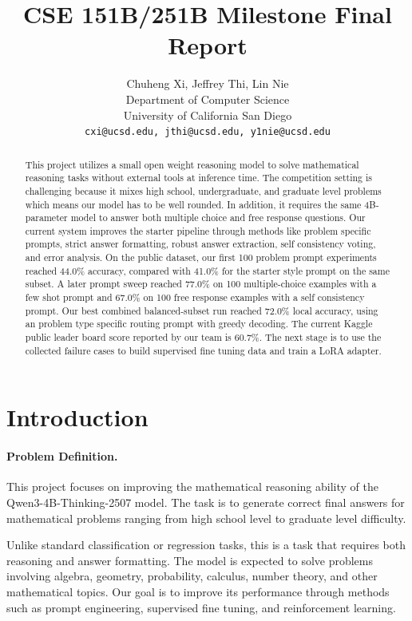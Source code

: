 \documentclass{article}
\title{
CSE 151B/251B Milestone Final Report
\\
}
\author{%
  Chuheng Xi, Jeffrey Thi, Lin Nie
  \\
  Department of Computer Science\\
  University of California San Diego\\
  \texttt{cxi@ucsd.edu, jthi@ucsd.edu, y1nie@ucsd.edu} \\
}
\begin{document}
\maketitle


\begin{abstract}
This project utilizes a small open weight reasoning model to solve mathematical reasoning tasks without external tools at inference time. The competition setting is challenging because it mixes high school, undergraduate, and graduate level problems which means our model has to be well rounded. In addition, it requires the same 4B-parameter model to answer both multiple choice and free response questions. Our current system improves the starter pipeline through methods like problem specific prompts, strict answer formatting, robust answer extraction, self consistency voting, and error analysis. On the public dataset, our first 100 problem prompt experiments reached 44.0\% accuracy, compared with 41.0\% for the starter style prompt on the same subset. A later prompt sweep reached 77.0\% on 100 multiple-choice examples with a few shot prompt and 67.0\% on 100 free response examples with a self consistency prompt. Our best combined balanced-subset run reached 72.0\% local accuracy, using an problem type specific routing prompt with greedy decoding. The current Kaggle public leader board score reported by our team is 60.7\%. The next stage is to use the collected failure cases to build supervised fine tuning data and train a LoRA adapter. 
\end{abstract}

\section{Introduction}
\label{sec:intro}
\paragraph{Problem Definition.}
\hline

This project focuses on improving the mathematical reasoning ability of the Qwen3-4B-Thinking-2507 model. The task is to generate correct final answers for mathematical problems ranging from high school level to graduate level difficulty. 

Unlike standard classification or regression tasks, this is a task that requires both reasoning and answer formatting. The model is expected to solve problems involving algebra, geometry, probability, calculus, number theory, and other mathematical topics. Our goal is to improve its performance through methods such as prompt engineering, supervised fine tuning, and reinforcement learning.
\end{document}
